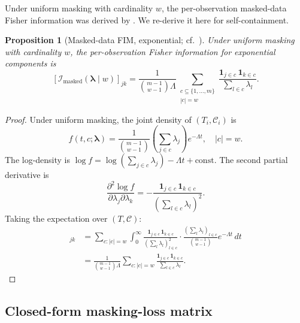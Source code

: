 \documentclass[11pt]{article}
\theoremstyle{definition}
\theoremstyle{plain}
\newtheorem{proposition}{Proposition}
\renewcommand{\v}[1]{\boldsymbol{#1}}
\newcommand{\FI}{\mathcal{I}}       %
\begin{document}
Under uniform masking with cardinality $w$, the per-observation
masked-data Fisher information was derived by
\citet{towell2026exponential}.
We re-derive it here for self-containment.

\begin{proposition}[Masked-data FIM, exponential;
cf.~\citealp{towell2026exponential}]
\label{prop:masked-fim}
Under uniform masking with cardinality $w$, the per-observation
Fisher information for exponential components is
\begin{equation}
\label{eq:masked-fim}
    [\FI_{\mathrm{masked}}(\v{\lambda} \mid w)]_{jk}
    = \frac{1}{\binom{m-1}{w-1} \Lambda}
    \sum_{\substack{c \subseteq \{1,\ldots,m\} \\ |c| = w}}
    \frac{\mathbf{1}_{j \in c} \, \mathbf{1}_{k \in c}}
         {\sum_{l \in c} \lambda_l}.
\end{equation}
\end{proposition}

\begin{proof}
Under uniform masking, the joint density of $(T_i, \mathcal{C}_i)$ is
\begin{equation}
    f(t, c; \v{\lambda}) = \frac{1}{\binom{m-1}{w-1}}
    \left(\sum_{j \in c} \lambda_j\right) e^{-\Lambda t},
    \quad |c| = w.
\end{equation}
The log-density is
$\log f = \log(\sum_{j \in c} \lambda_j) - \Lambda t + \text{const}$.
The second partial derivative is
\begin{equation}
    \frac{\partial^2 \log f}{\partial \lambda_j \partial \lambda_k}
    = -\frac{\mathbf{1}_{j \in c} \, \mathbf{1}_{k \in c}}
           {(\sum_{l \in c} \lambda_l)^2}.
\end{equation}
Taking the expectation over $(T, \mathcal{C})$:
\begin{align}
    [\FI_{\mathrm{masked}}]_{jk}
    &= \sum_{c: |c|=w} \int_0^\infty
        \frac{\mathbf{1}_{j \in c} \, \mathbf{1}_{k \in c}}
             {(\sum_l \lambda_l)_{l \in c}^2}
        \cdot \frac{(\sum_l \lambda_l)_{l \in c}}{\binom{m-1}{w-1}}
        e^{-\Lambda t}\, dt \\
    &= \frac{1}{\binom{m-1}{w-1} \Lambda}
        \sum_{c: |c|=w}
        \frac{\mathbf{1}_{j \in c} \, \mathbf{1}_{k \in c}}
             {\sum_{l \in c} \lambda_l}.
\end{align}
\end{proof}

\subsection{Closed-form masking-loss matrix}
\end{document}
